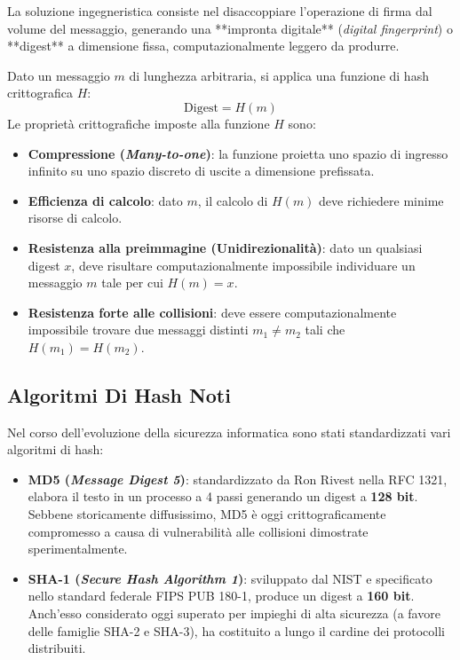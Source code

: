 \documentclass[11pt, a4paper]{article}
\begin{document}
La soluzione ingegneristica consiste nel disaccoppiare l'operazione di firma dal volume del messaggio, generando una **impronta digitale** (\emph{digital fingerprint}) o **digest** a dimensione fissa, computazionalmente leggero da produrre.


Dato un messaggio $m$ di lunghezza arbitraria, si applica una funzione di hash crittografica $H$:
\begin{equation}
\text{Digest} = H(m)
\end{equation}
Le proprietà crittografiche imposte alla funzione $H$ sono:
\begin{itemize}[leftmargin=*]
    \item \textbf{Compressione (\emph{Many-to-one})}: la funzione proietta uno spazio di ingresso infinito su uno spazio discreto di uscite a dimensione prefissata.
    \item \textbf{Efficienza di calcolo}: dato $m$, il calcolo di $H(m)$ deve richiedere minime risorse di calcolo.
    \item \textbf{Resistenza alla preimmagine (Unidirezionalità)}: dato un qualsiasi digest $x$, deve risultare computazionalmente impossibile individuare un messaggio $m$ tale per cui $H(m) = x$.
    \item \textbf{Resistenza forte alle collisioni}: deve essere computazionalmente impossibile trovare due messaggi distinti $m_1 \neq m_2$ tali che $H(m_1) = H(m_2)$.
\end{itemize}

\subsection{Algoritmi Di Hash Noti}

Nel corso dell'evoluzione della sicurezza informatica sono stati standardizzati vari algoritmi di hash:


\begin{itemize}[leftmargin=*]
    \item \textbf{MD5 (\emph{Message Digest 5})}: standardizzato da Ron Rivest nella RFC 1321, elabora il testo in un processo a 4 passi generando un digest a \textbf{128 bit}. Sebbene storicamente diffusissimo, MD5 è oggi crittograficamente compromesso a causa di vulnerabilità alle collisioni dimostrate sperimentalmente.
    \item \textbf{SHA-1 (\emph{Secure Hash Algorithm 1})}: sviluppato dal NIST e specificato nello standard federale FIPS PUB 180-1, produce un digest a \textbf{160 bit}. Anch'esso considerato oggi superato per impieghi di alta sicurezza (a favore delle famiglie SHA-2 e SHA-3), ha costituito a lungo il cardine dei protocolli distribuiti.
\end{itemize}
\end{document}
